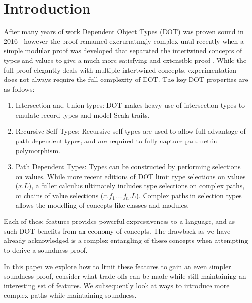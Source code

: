 \section{Introduction}
After many years of work Dependent Object Types (DOT) was proven sound in 2016 \cite{nada and tiark 2016}, however the proof remained excruciatingly complex until recently when a simple modular proof was developed that separated the intertwined concepts of types and values to give a much more satisfying and extensible proof \cite{marianna stuff}. While the full proof elegantly deals with multiple intertwined concepts, experimentation does not always require the full complexity of DOT. The key DOT properties are as follows:
\begin{enumerate}
\item
Intersection and Union types: DOT makes heavy use of intersection types to emulate record types and model Scala traits.
\item
Recursive Self Types: Recursive self types are used to allow full advantage of path dependent types, and are required to fully capture parametric polymorphism.
\item
Path Dependent Types: Types can be constructed by performing selections on values. While more recent editions of DOT limit type selections on values ($x.L$), a fuller calculus ultimately includes type selections on complex paths, or chains of value selections ($x.f_1 \ldots .f_n.L$). Complex paths in selection types allows the modelling of concepts like classes and modules.
\end{enumerate}
Each of these features provides powerful expressiveness to a language, and as such DOT benefits from an economy of concepts. The drawback as we have already acknowledged is a complex entangling of these concepts when attempting to derive a soundness proof. 


In this paper we explore how to limit these features to gain an even simpler soundness proof, consider what trade-offs can be made while still maintaining an interesting set of features. We subsequently look at ways to introduce more complex paths while maintaining soundness.


